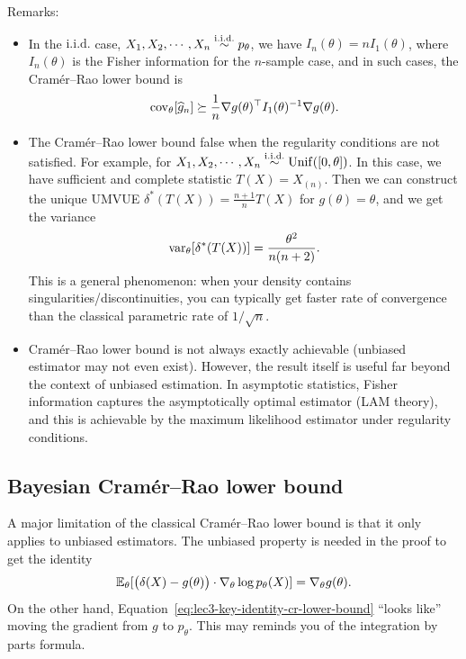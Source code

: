 \documentclass[11pt,letterpaper]{article}
\numberwithin{theorem}{lecture}
\numberwithin{proposition}{lecture}
\numberwithin{lemma}{lecture}
\numberwithin{claim}{lecture}
\numberwithin{corollary}{lecture}
\numberwithin{definition}{lecture}
\numberwithin{conjecture}{lecture}
\numberwithin{remark}{lecture}
\numberwithin{example}{lecture}
\numberwithin{equation}{lecture}
\begin{document}
\noindent Remarks:
\begin{itemize}
  \item In the $\mathrm{i.i.d.}$ case, $X_1, X_2, \cdots, X_n \overset{\mathrm{i.i.d.}}{\sim} p_\theta$, we have $I_n (\theta) = n I_1 (\theta)$, where $I_n (\theta)$ is the Fisher information for the $n$-sample case, and in such cases, the Cram\'{e}r--Rao lower bound is
  \begin{align*}
    \operatorname{cov}_\theta [\widehat{g}_n] \succeq \frac{1}{n} \nabla g (\theta)^\top I_1 (\theta)^{-1} \nabla g (\theta).
  \end{align*}
  \item The Cram\'{e}r--Rao lower bound false when the regularity conditions are not satisfied. For example, for $X_1, X_2, \cdots, X_n \overset{\mathrm{i.i.d.}}{\sim} \mathrm{Unif} ([0, \theta])$. In this case, we have sufficient and complete statistic $T(X) = X_{(n)}$. Then we can construct the unique UMVUE $\delta^* (T(X)) = \frac{n + 1}{n} T(X)$ for $g (\theta) = \theta$, and we get the variance
  \begin{align*}
    \operatorname{var}_\theta [\delta^* (T(X))] = \frac{\theta^2}{n (n + 2)}.
  \end{align*}
  This is a general phenomenon: when your density contains singularities/discontinuities, you can typically get faster rate of convergence than the classical parametric rate of $1/\sqrt{n}$.
  \item Cram\'{e}r--Rao lower bound is not always exactly achievable (unbiased estimator may not even exist). However, the result itself is useful far beyond the context of unbiased estimation. In asymptotic statistics, Fisher information captures the asymptotically optimal estimator (LAM theory), and this is achievable by the maximum likelihood estimator under regularity conditions.
\end{itemize}

\subsection{Bayesian Cram\'{e}r--Rao lower bound}
A major limitation of the classical Cram\'{e}r--Rao lower bound is that it only applies to unbiased estimators. The unbiased property is needed in the proof to get the identity
\begin{align}
{\mathbb{E}}_\theta [ \big(\delta (X) - g (\theta)\big) \cdot \nabla_\theta \log p_\theta (X)] = \nabla_\theta g (\theta).  \label{eq:lec3-key-identity-cr-lower-bound}
\end{align}
On the other hand, Equation~\eqref{eq:lec3-key-identity-cr-lower-bound} ``looks like'' moving the gradient from $g$ to $p_\theta$. This may reminds you of the integration by parts formula.
\end{document}

